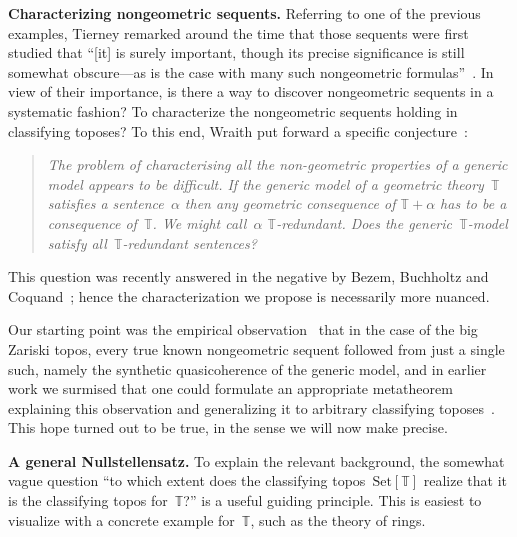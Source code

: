 \documentclass[oneside,reqno]{amsart}
\theoremstyle{definition}
\theoremstyle{plain}
\theoremstyle{remark}
\newcommand{\TT}{\mathbb{T}}
\newcommand{\Set}{\mathrm{Set}}
\renewcommand{\_}{\mathpunct{.}\,}
\newcommand{\?}{\,{:}\,}
\renewcommand{\paragraph}[1]{\noindent\textbf{#1.}}
\begin{document}
\paragraph{Characterizing nongeometric sequents} Referring to one of the previous
examples, Tierney remarked around the time that those sequents were first
studied that ``[it] is surely important, though its precise significance is
still somewhat obscure---as is the case with many such nongeometric
formulas''~\cite[p.~209]{tierney:spectrum}. In view of their importance, is
there a way to discover nongeometric sequents in a systematic fashion? To
characterize the nongeometric sequents holding in classifying toposes? To this
end, Wraith put forward a specific conjecture~\cite[p.~336]{wraith:intuitionistic-algebra}:
\begin{quote}
\emph{The problem of characterising all the non-geometric properties of a generic
model appears to be difficult. If the generic model of a geometric theory~$\TT$
satisfies a sentence~$\alpha$ then any geometric consequence of $\TT + \alpha$ has to be a
consequence of~$\TT$. We might call~$\alpha$ $\TT$-redundant. Does the
generic~$\TT$-model satisfy all~$\TT$-redundant sentences?}
\end{quote}
This question was recently answered in the negative by Bezem, Buchholtz and
Coquand~\cite{bezem-buchholtz-coquand:syntactic-forcing-models}; hence the
characterization we propose is necessarily more nuanced.

Our starting point was the empirical
observation~\cite[p.~164]{blechschmidt:phd} that in the case of the big
Zariski topos, every true known nongeometric sequent followed from just a
single such, namely the synthetic quasicoherence of the generic
model, and in earlier work we surmised that one could formulate an appropriate
metatheorem explaining this observation and generalizing it to arbitrary
classifying toposes~\cite[Speculation~22.1]{blechschmidt:phd}. This hope turned
out to be true, in the sense we will now make precise.
\medskip

\paragraph{A general Nullstellensatz} To explain the relevant background, the
somewhat vague question ``to which extent does the classifying
topos~$\Set[\TT]$ realize that it is the classifying topos for~$\TT$?'' is a
useful guiding principle. This is easiest to visualize with a concrete example
for~$\TT$, such as the theory of rings.
\end{document}
